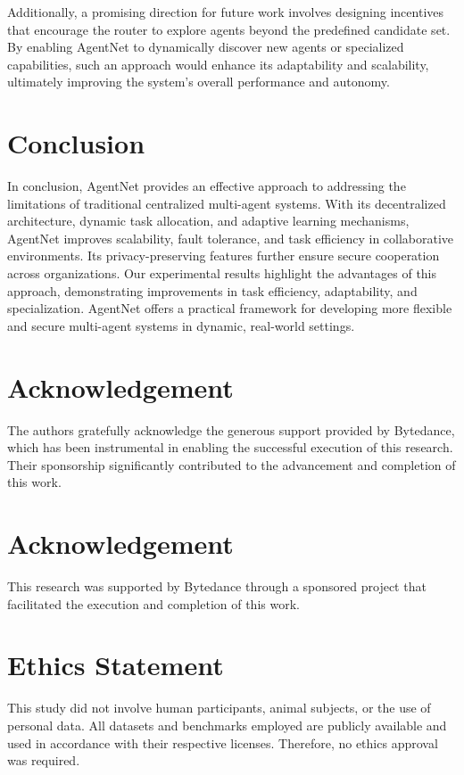 \documentclass{article}
\begin{document}
Additionally, a promising direction for future work involves designing incentives that encourage the router to explore agents beyond the predefined candidate set.   By enabling AgentNet to dynamically discover new agents or specialized capabilities, such an approach would enhance its adaptability and scalability, ultimately improving the system’s overall performance and autonomy.


\section{Conclusion}
In conclusion, AgentNet provides an effective approach to addressing the limitations of traditional centralized multi-agent systems. With its decentralized architecture, dynamic task allocation, and adaptive learning mechanisms, AgentNet improves scalability, fault tolerance, and task efficiency in collaborative environments. Its privacy-preserving features further ensure secure cooperation across organizations. Our experimental results highlight the advantages of this approach, demonstrating improvements in task efficiency, adaptability, and specialization. AgentNet offers a practical framework for developing more flexible and secure multi-agent systems in dynamic, real-world settings.


\section*{Acknowledgement}
The authors gratefully acknowledge the generous support provided by Bytedance, which has been instrumental in enabling the successful execution of this research. Their sponsorship significantly contributed to the advancement and completion of this work.

\section*{Acknowledgement}
This research was supported by Bytedance through a sponsored project that facilitated the execution and completion of this work.



\section*{Ethics Statement}
This study did not involve human participants, animal subjects, or the use of personal data. All datasets and benchmarks employed are publicly available and used in accordance with their respective licenses. Therefore, no ethics approval was required.
\end{document}

